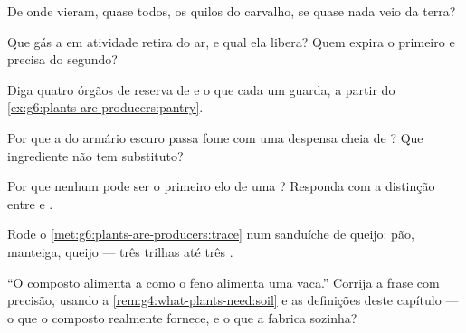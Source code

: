 \begin{exercise}[$\star$]\label{exo:g6:plants-are-producers:4}
De onde vieram, quase todos, os quilos do carvalho, se quase nada
veio da terra?
\end{exercise}

\begin{exercise}[$\star$]\label{exo:g6:plants-are-producers:5}
Que gás a  em atividade retira do ar, e qual ela libera? Quem
expira o primeiro e precisa do segundo?
\end{exercise}

\begin{exercise}[$\star$]\label{exo:g6:plants-are-producers:6}
Diga quatro órgãos de reserva de  e o que cada um guarda, a
partir do \cref{ex:g6:plants-are-producers:pantry}.
\end{exercise}

\begin{exercise}[$\star\star$]\label{exo:g6:plants-are-producers:7}
Por que a  do armário escuro passa fome com uma despensa cheia
de ? Que ingrediente não tem substituto?
\end{exercise}

\begin{exercise}[$\star\star$]\label{exo:g6:plants-are-producers:8}
Por que nenhum  pode ser o primeiro elo de uma ? Responda com a distinção entre  e .
\end{exercise}

\begin{exercise}[$\star\star$]\label{exo:g6:plants-are-producers:9}
Rode o \cref{met:g6:plants-are-producers:trace} num sanduíche de
queijo: pão, manteiga, queijo --- três trilhas até três .
\end{exercise}

\begin{exercise}[$\star\star$]\label{exo:g6:plants-are-producers:10}
``O composto alimenta a  como o feno alimenta uma vaca.''
Corrija a frase com precisão, usando a
\cref{rem:g4:what-plants-need:soil} e as definições deste capítulo
--- o que o composto realmente fornece, e o que a  fabrica
sozinha?
\end{exercise}

